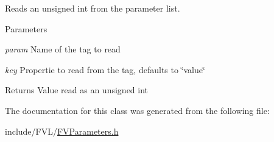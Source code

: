Reads an unsigned int from the parameter list. 


\begin{DoxyParams}{Parameters}
\item[{\em param}]Name of the tag to read \item[{\em key}]Propertie to read from the tag, defaults to \char`\"{}value\char`\"{} \end{DoxyParams}
\begin{DoxyReturn}{Returns}
Value read as an unsigned int 
\end{DoxyReturn}


The documentation for this class was generated from the following file:\begin{DoxyCompactItemize}
\item 
include/FVL/\hyperlink{FVParameters_8h}{FVParameters.h}\end{DoxyCompactItemize}
